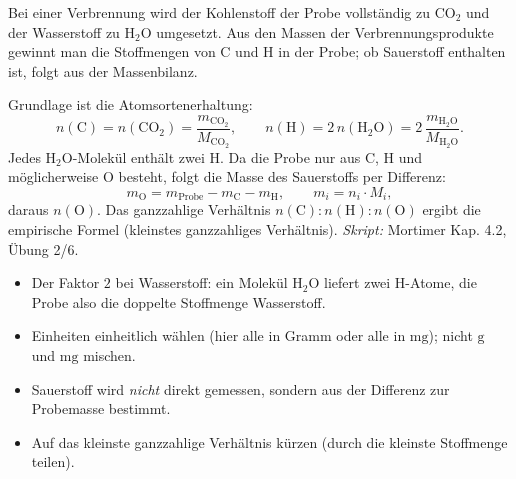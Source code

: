 

Bei einer Verbrennung wird der Kohlenstoff der Probe vollständig zu
$\mathrm{CO_2}$ und der Wasserstoff zu $\mathrm{H_2O}$ umgesetzt. Aus den
Massen der Verbrennungsprodukte gewinnt man die Stoffmengen von C und H in der
Probe; ob Sauerstoff enthalten ist, folgt aus der Massenbilanz.

\begin{werkzeugkasten}[Verbrennungsanalyse]
Grundlage ist die Atomsortenerhaltung:
\begin{equation}
  n(\mathrm{C}) = n(\mathrm{CO_2})
  = \frac{m_{\mathrm{CO_2}}}{M_{\mathrm{CO_2}}},\qquad
  n(\mathrm{H}) = 2\, n(\mathrm{H_2O})
  = 2\,\frac{m_{\mathrm{H_2O}}}{M_{\mathrm{H_2O}}}.
\end{equation}
Jedes $\mathrm{H_2O}$-Molekül enthält zwei H. Da die Probe nur aus C, H und
möglicherweise O besteht, folgt die Masse des Sauerstoffs per Differenz:
\begin{equation}
  m_{\mathrm{O}} = m_{\mathrm{Probe}} - m_{\mathrm{C}} - m_{\mathrm{H}},\qquad
  m_i = n_i \cdot M_i,
\end{equation}
daraus $n(\mathrm{O})$. Das ganzzahlige Verhältnis $n(\mathrm{C}):
n(\mathrm{H}):n(\mathrm{O})$ ergibt die empirische Formel (kleinstes
ganzzahliges Verhältnis).
\textit{Skript:} Mortimer Kap. 4.2, Übung 2/6.
\end{werkzeugkasten}

\begin{achtung}
\begin{itemize}
  \item Der Faktor $2$ bei Wasserstoff: ein Molekül $\mathrm{H_2O}$ liefert
        zwei H-Atome, die Probe also die doppelte Stoffmenge Wasserstoff.
  \item Einheiten einheitlich wählen (hier alle in Gramm oder alle in
        $\mathrm{mg}$); nicht $\mathrm{g}$ und $\mathrm{mg}$ mischen.
  \item Sauerstoff wird \emph{nicht} direkt gemessen, sondern aus der
        Differenz zur Probemasse bestimmt.
  \item Auf das kleinste ganzzahlige Verhältnis kürzen (durch die kleinste
        Stoffmenge teilen).
\end{itemize}
\end{achtung}
